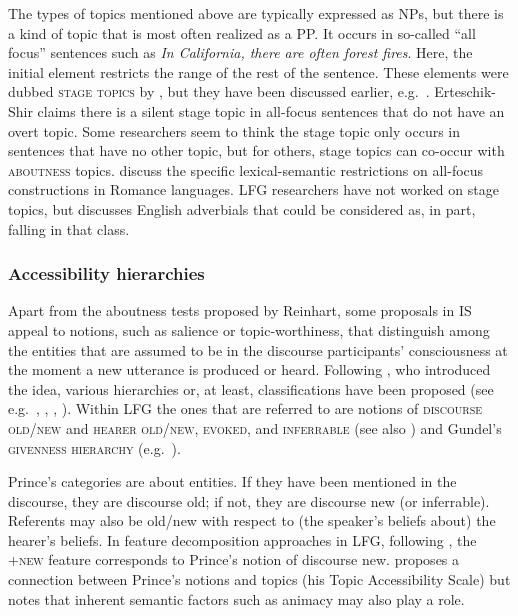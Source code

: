 \documentclass[output=paper,hidelinks]{langscibook}
\begin{document}
The types of topics mentioned above are typically expressed as NPs, but there is a kind of topic that is most often realized as a {PP}. It occurs in so-called ``all focus'' sentences such as \textit{In California, there are often forest fires}. Here, the initial element restricts the range of the rest of the sentence. These elements were dubbed \textsc{stage topics} by \citet{Erteschik-Shir2007}, but they have been discussed earlier, e.g.\ \citet{Gundel74}. Erteschik-Shir claims there is a silent stage topic in all-focus sentences that do not have an overt topic. Some researchers seem to think the stage topic only occurs in sentences that have no other topic,  but for others, stage topics can co-occur with \textsc{aboutness} topics. \citet{BC} discuss the specific lexical-semantic restrictions on all-focus constructions in Romance languages. LFG researchers have not worked on stage topics, but \citet{Szucs2017} discusses English adverbials that could be considered as, in part, falling in that class. 

\subsubsection{Accessibility hierarchies} \label{AH}

 Apart from the aboutness tests proposed by Reinhart, some proposals in IS appeal to notions, such as salience or topic-worthiness, that distinguish among the entities that are assumed to be in the discourse participants' consciousness at the moment a new utterance is produced or heard. Following \citet{Chafe1987}, who introduced the idea, various hierarchies or, at least, classifications have been proposed  (see e.g.\ \citealt{Givon}, \citealt{Ariel}, \citealt{Lambrecht}, \citealt{Erteschik-Shir2007}). Within LFG the ones that are referred to are  notions of \textsc{discourse old/new} and \textsc{hearer old/new}, \textsc{evoked}, and \textsc{inferrable} (see also \citealt{WardBirner}) and Gundel's \textsc{givenness hierarchy} (e.g.\ \citealt{GHZ93}). 
 
 Prince's categories are about entities. If they have been mentioned in the discourse, they are discourse old; if not, they are discourse new (or inferrable).  Referents may also be old/new with respect to (the speaker's beliefs about) the hearer's beliefs. In feature decomposition approaches in LFG, following \citet{Choi1996}, the {+\textsc{new}} feature corresponds to Prince's notion of discourse new. \citet{Lambrecht} proposes a connection between Prince's notions and topics (his Topic Accessibility Scale) but notes that inherent semantic factors such as animacy may also play a role. 
 
\end{document}
